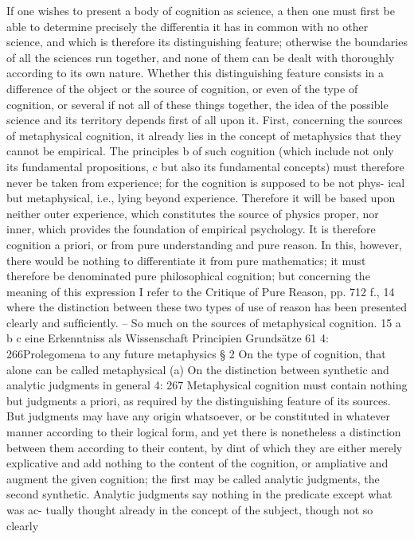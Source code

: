 If one wishes to present a body of cognition as science, a then one must ﬁrst
be able to determine precisely the differentia it has in common with no
other science, and which is therefore its distinguishing feature; otherwise
the boundaries of all the sciences run together, and none of them can be
dealt with thoroughly according to its own nature.
Whether this distinguishing feature consists in a difference of the
object or the source of cognition, or even of the type of cognition, or several
if not all of these things together, the idea of the possible science and its
territory depends ﬁrst of all upon it.
First, concerning the sources of metaphysical cognition, it already
lies in the concept of metaphysics that they cannot be empirical. The
principles b of such cognition (which include not only its fundamental
propositions, c but also its fundamental concepts) must therefore never
be taken from experience; for the cognition is supposed to be not phys-
ical but metaphysical, i.e., lying beyond experience. Therefore it will
be based upon neither outer experience, which constitutes the source
of physics proper, nor inner, which provides the foundation of empirical
psychology. It is therefore cognition a priori, or from pure understanding
and pure reason.
In this, however, there would be nothing to differentiate it from
pure mathematics; it must therefore be denominated pure philosophical
cognition; but concerning the meaning of this expression I refer to the
Critique of Pure Reason, pp. 712 f., 14 where the distinction between these
two types of use of reason has been presented clearly and sufﬁciently. –
So much on the sources of metaphysical cognition. 15
a
b
c
eine Erkenntniss als Wissenschaft
Principien
Grundsätze
61
4: 266Prolegomena to any future metaphysics
§ 2
On the type of cognition,
that alone can be called metaphysical
(a) On the distinction between synthetic and analytic
judgments in general
4: 267
Metaphysical cognition must contain nothing but judgments a priori,
as required by the distinguishing feature of its sources. But judgments
may have any origin whatsoever, or be constituted in whatever manner
according to their logical form, and yet there is nonetheless a distinction
between them according to their content, by dint of which they are
either merely explicative and add nothing to the content of the cognition,
or ampliative and augment the given cognition; the ﬁrst may be called
analytic judgments, the second synthetic.
Analytic judgments say nothing in the predicate except what was ac-
tually thought already in the concept of the subject, though not so clearly
